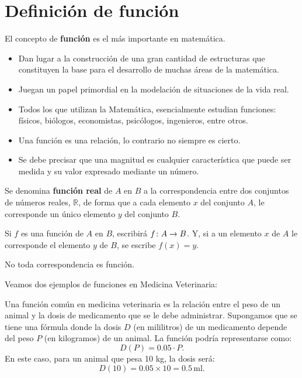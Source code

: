 \documentclass[a4,11pt]{aleph-notas}
\begin{document}
\encabezado

\section{Definición de función}

El concepto de \textbf{función} es el más importante en matemática.
\begin{itemize}
    \item Dan lugar a la construcción de una gran cantidad de estructuras que constituyen la base para el desarrollo de muchas áreas de la matemática.
    \item Juegan un papel primordial en la modelación de situaciones de la vida real.
    \item Todos los que utilizan la Matemática, esencialmente estudian funciones: físicos, biólogos, economistas, psicólogos, ingenieros, entre otros.
    \item Una función es una relación, lo contrario no siempre es cierto.
    \item Se debe precisar que una magnitud es cualquier característica que puede ser medida y su valor expresado mediante un número.    
\end{itemize}

\vspace{1pt}
\begin{defi}[Función]
    Se denomina \textbf{función real} de $A$ en $B$ a la correspondencia entre dos conjuntos de números reales, $\mathbb{R}$, de forma que a cada elemento $x$ del conjunto $A$, le corresponde un único elemento $y$ del conjunto $B$.
\end{defi}

\begin{advertencia}
    Si $f$ es una función de $A$ en $B$, escribirá $f\colon A \rightarrow B$. Y, si a un elemento $x$ de $A$ le corresponde el elemento $y$ de $B$, se escribe $f(x)=y$.
\end{advertencia}

\begin{obs}
    No toda correspondencia es función.
\end{obs}

Veamos dos ejemplos de funciones en Medicina Veterinaria:

\begin{ejem}
    Una función común en medicina veterinaria es la relación entre el peso de un animal y la dosis de medicamento que se le debe administrar. Supongamos que se tiene una fórmula donde la dosis  $D$ (en mililitros) de un medicamento depende del peso $P$ (en kilogramos) de un animal. La función podría representarse como:
    \[ 
        D(P) = 0.05 \cdot P.
    \]
    En este caso, para un animal que pesa 10 kg, la dosis será:
    \[
        D(10) = 0.05 \times 10 = 0.5 \, \text{ml}.
    \]
\end{ejem}
\end{document}
